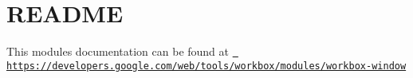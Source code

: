 \chapter{README}
\hypertarget{md_node__modules_2workbox-window_2README}{}\label{md_node__modules_2workbox-window_2README}
This module\textquotesingle{}s documentation can be found at \href{https://developers.google.com/web/tools/workbox/modules/workbox-window}{\texttt{ https\+://developers.\+google.\+com/web/tools/workbox/modules/workbox-\/window}} 